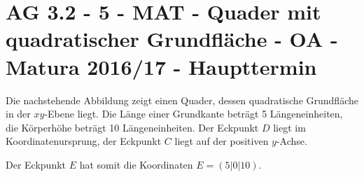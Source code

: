 \section{AG 3.2 - 5 - MAT - Quader mit quadratischer Grundfläche - OA - Matura 2016/17 - Haupttermin}

\begin{beispiel}[AG 3.2]{1} %

Die nachstehende Abbildung zeigt einen Quader, dessen quadratische Grundfläche in der
$xy$-Ebene liegt. Die Länge einer Grundkante beträgt 5 Längeneinheiten, die Körperhöhe beträgt
10 Längeneinheiten. Der Eckpunkt $D$ liegt im Koordinatenursprung, der Eckpunkt $C$ liegt auf der positiven $y$-Achse. \leer

Der Eckpunkt $E$ hat somit die Koordinaten $E = (5|0|10)$.


\end{beispiel}
